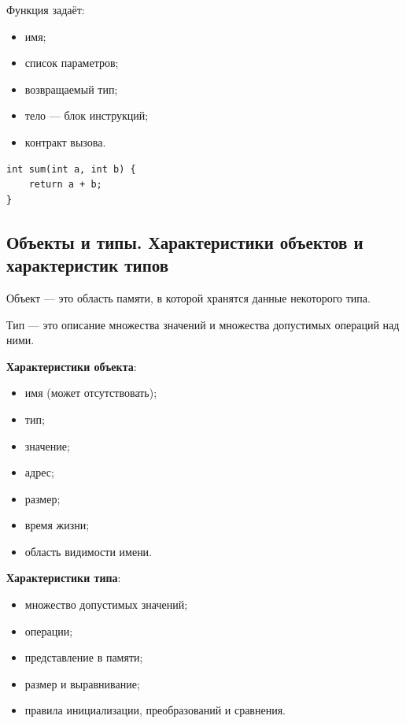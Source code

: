 Функция задаёт:
\begin{itemize}
    \item имя;
    \item список параметров;
    \item возвращаемый тип;
    \item тело — блок инструкций;
    \item контракт вызова.
\end{itemize}

\begin{example}
\begin{verbatim}
int sum(int a, int b) {
    return a + b;
}
\end{verbatim}
\end{example}

\subsection{Объекты и типы. Характеристики объектов и характеристик типов}
\begin{definition}[Объект]
Объект — это область памяти, в которой хранятся данные некоторого типа.
\end{definition}

\begin{definition}[Тип]
Тип — это описание множества значений и множества допустимых операций над ними.
\end{definition}

\textbf{Характеристики объекта}:
\begin{itemize}
    \item имя (может отсутствовать);
    \item тип;
    \item значение;
    \item адрес;
    \item размер;
    \item время жизни;
    \item область видимости имени.
\end{itemize}

\textbf{Характеристики типа}:
\begin{itemize}
    \item множество допустимых значений;
    \item операции;
    \item представление в памяти;
    \item размер и выравнивание;
    \item правила инициализации, преобразований и сравнения.
\end{itemize}

